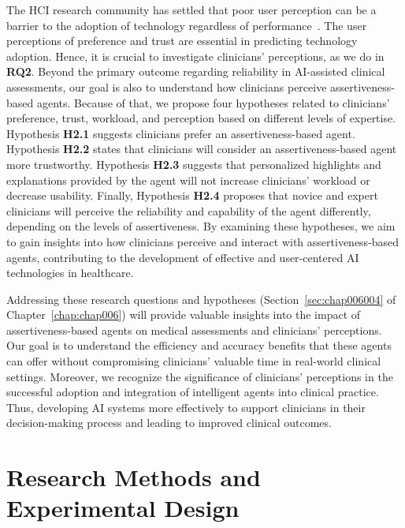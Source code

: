 The \ac{HCI} research community has settled that poor user perception can be a barrier to the adoption of technology regardless of performance~\cite{10.1145/3313831.3376506, 10.1145/3479549}.
The user perceptions of preference and trust are essential in predicting technology adoption.
Hence, it is crucial to investigate clinicians' perceptions, as we do in {\bf RQ2}.
Beyond the primary outcome regarding reliability in \ac{AI}-assisted clinical assessments, our goal is also to understand how clinicians perceive assertiveness-based agents.
Because of that, we propose four hypotheses related to clinicians' preference, trust, workload, and perception based on different levels of expertise.
Hypothesis {\bf H2.1} suggests clinicians prefer an assertiveness-based agent.
Hypothesis {\bf H2.2} states that clinicians will consider an assertiveness-based agent more trustworthy.
Hypothesis {\bf H2.3} suggests that personalized highlights and explanations provided by the agent will not increase clinicians' workload or decrease usability.
Finally, Hypothesis {\bf H2.4} proposes that novice and expert clinicians will perceive the reliability and capability of the agent differently, depending on the levels of assertiveness.
By examining these hypotheses, we aim to gain insights into how clinicians perceive and interact with assertiveness-based agents, contributing to the development of effective and user-centered \ac{AI} technologies in healthcare.

Addressing these research questions and hypotheses (Section~\ref{sec:chap006004} of Chapter~\ref{chap:chap006}) will provide valuable insights into the impact of assertiveness-based agents on medical assessments and clinicians' perceptions.
Our goal is to understand the efficiency and accuracy benefits that these agents can offer without compromising clinicians' valuable time in real-world clinical settings.
Moreover, we recognize the significance of clinicians' perceptions in the successful adoption and integration of intelligent agents into clinical practice.
Thus, developing \ac{AI} systems more effectively to support clinicians in their decision-making process and leading to improved clinical outcomes.

\section{Research Methods and Experimental Design}
\label{sec:app005006}

